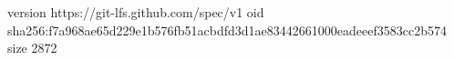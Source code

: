 version https://git-lfs.github.com/spec/v1
oid sha256:f7a968ae65d229e1b576fb51acbdfd3d1ae83442661000eadeeef3583cc2b574
size 2872
